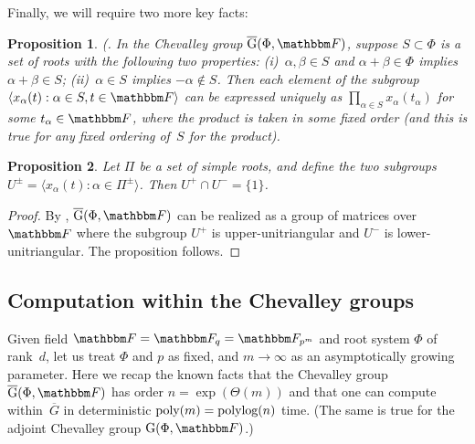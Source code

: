 \documentclass[10pt,a4paper]{article}
\newtheorem{theorem}{Theorem}[section]
\newtheorem{proposition}[theorem]{Proposition}
\theoremstyle{definition}
\newtheorem{definition}[theorem]{Definition}
\newcommand{\poly}{\textnormal{poly}}
\newcommand{\polylog}{\textnormal{polylog}}
\newcommand{\F}{\mathbbm F}
\newcommand{\la}{\langle}
\newcommand{\ra}{\rangle}
\newcommand{\ol}[1]{\overline{#1}}
\newcommand{\rnote}[1]{}
\newcommand{\Esc}[2]{\ol{\mathrm{G}}(#1,#2)}
\newcommand{\Gu}[2]{\ol{\mathrm{G}}(#1,#2)}
\newcommand{\Gad}[2]{\mathrm{G}(#1,#2)}
\newcommand{\G}[2]{\mathrm{G}(#1,#2)}
\begin{document}





Finally, we will require two more key facts:
\begin{proposition} \label{prop:steinberg17}
    \textnormal{(\cite[Lem.~17]{Ste16}.}
    In the Chevalley group $\Esc{\Phi}{\F}$, suppose $S \subset \Phi$ is a set of roots with the following two properties: (i)~$\alpha, \beta \in S$ and $\alpha + \beta \in \Phi$ implies $\alpha + \beta \in S$; (ii)~$\alpha \in S$ implies $-\alpha \not \in S$.
    Then each element of the subgroup $\la x_\alpha(t) : \alpha \in S, t \in \F \ra$ can be expressed uniquely as $\prod_{\alpha \in S} x_\alpha(t_\alpha)$ for some $t_\alpha \in \F$, where the product is taken in some fixed order (and this is true for any fixed ordering of~$S$ for the product).
\end{proposition}
\begin{proposition}\label{prop:uniint}
Let $\Pi$ be a set of simple roots, and define the two subgroups $U^\pm = \langle x_{\alpha}(t) : \alpha \in \Pi^\pm \rangle$. Then $U^+ \cap U^- = \{1\}$.
\end{proposition}
\begin{proof}
By \cite[Lem.~18, Cor.~3]{Ste16}, $\Esc{\Phi}{\F}$ can be realized as a group of matrices over $\F$ where the subgroup $U^+$ is upper-unitriangular and $U^{-}$ is lower-unitriangular. The proposition follows.
\end{proof}

\subsection{Computation within the Chevalley groups}    \label{sec:computation}
Given field $\F = \F_q = \F_{p^m}$ and root system $\Phi$ of rank~$d$, let us treat $\Phi$ and $p$ as fixed, and $m \to \infty$ as an asymptotically growing parameter.
Here we recap the known facts that the Chevalley group $\Gu{\Phi}{\F}$ has order $n = \exp(\Theta(m))$ and that one can compute within~$\ol{G}$ in deterministic $\poly(m) = \polylog(n)$ time.
(The same is true for the adjoint Chevalley group $\Gad{\Phi}{\F}$.)\\
\end{document}
